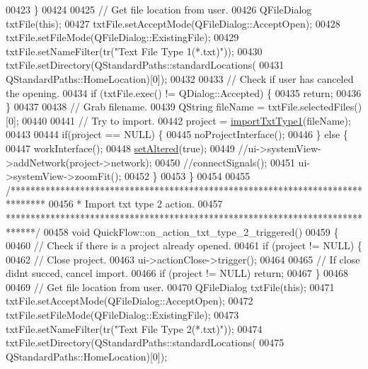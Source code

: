 \begin{DoxyCode}
00423   \}
00424 
00425   \textcolor{comment}{// Get file location from user.}
00426   QFileDialog txtFile(\textcolor{keyword}{this});
00427   txtFile.setAcceptMode(QFileDialog::AcceptOpen);
00428   txtFile.setFileMode(QFileDialog::ExistingFile);
00429   txtFile.setNameFilter(tr(\textcolor{stringliteral}{"Text File Type 1(*.txt)"}));
00430   txtFile.setDirectory(QStandardPaths::standardLocations(
00431                          QStandardPaths::HomeLocation)[0]);
00432 
00433   \textcolor{comment}{// Check if user has canceled the opening.}
00434   \textcolor{keywordflow}{if} (txtFile.exec() != QDialog::Accepted) \{
00435     \textcolor{keywordflow}{return};
00436   \}
00437 
00438   \textcolor{comment}{// Grab filename.}
00439   QString fileName = txtFile.selectedFiles()[0];
00440 
00441   \textcolor{comment}{// Try to import.}
00442   project = \hyperlink{import_8cpp_a67dd59b2afe82bc7272ad6dfd3bed633}{importTxtType1}(fileName);
00443 
00444   \textcolor{keywordflow}{if}(project == NULL) \{
00445     noProjectInterface();
00446   \} \textcolor{keywordflow}{else} \{
00447     workInterface();
00448     \hyperlink{group___window_ga4b63ea5ca52a9eea14db0a22b5a133f8}{setAltered}(\textcolor{keyword}{true});
00449     \textcolor{comment}{//ui->systemView->addNetwork(project->network);}
00450     \textcolor{comment}{//connectSignals();}
00451     ui->systemView->zoomFit();
00452   \}
00453 \}
00454 
00455 \textcolor{comment}{/*******************************************************************************}
00456 \textcolor{comment}{ * Import txt type 2 action.}
00457 \textcolor{comment}{ ******************************************************************************/}
00458 \textcolor{keywordtype}{void} QuickFlow::on\_action\_txt\_type\_2\_triggered()
00459 \{
00460   \textcolor{comment}{// Check if there is a project already opened.}
00461   \textcolor{keywordflow}{if} (project != NULL) \{
00462     \textcolor{comment}{// Close project.}
00463     ui->actionClose->trigger();
00464 
00465     \textcolor{comment}{// If close didnt succed, cancel import.}
00466     \textcolor{keywordflow}{if} (project != NULL) \textcolor{keywordflow}{return};
00467   \}
00468 
00469   \textcolor{comment}{// Get file location from user.}
00470   QFileDialog txtFile(\textcolor{keyword}{this});
00471   txtFile.setAcceptMode(QFileDialog::AcceptOpen);
00472   txtFile.setFileMode(QFileDialog::ExistingFile);
00473   txtFile.setNameFilter(tr(\textcolor{stringliteral}{"Text File Type 2(*.txt)"}));
00474   txtFile.setDirectory(QStandardPaths::standardLocations(
00475                          QStandardPaths::HomeLocation)[0]);

\end{DoxyCode}
